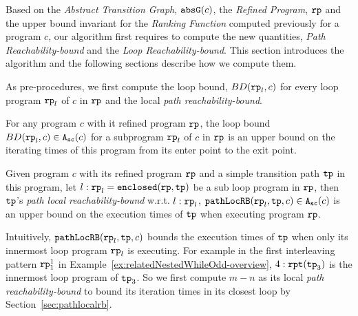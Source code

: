 Based on the \emph{Abstract Transition Graph}, $\mathtt{abs}{\mathtt{G}}(c)$, the \emph{Refined Program}, $\mathtt{rp}$ and the upper bound invariant for the \emph{Ranking Function} computed previously for a program $c$, our algorithm first requires to compute the new quantities, \emph{Path Reachability-bound} and the \emph{Loop Reachability-bound}. This section introduces the algorithm and the following sections describe how we compute them.

As pre-procedures, we first compute the loop bound, $BD(\mathtt{rp}_l, c)$ for every loop program $\mathtt{rp}_l$ of $c$ in $\mathtt{rp}$ and the local \emph{path reachability-bound}.
\begin{defn}
  For any program $c$ with it refined program $\mathtt{rp}$,
  the loop bound $BD(\mathtt{rp}_l, c) \in {\ensuremath{\mathtt{A_{sc}}}}(c)$ for a subprogram $\mathtt{rp}_l$ of $c$ in $\mathtt{rp}$ is an upper bound on the iterating times of this program from its enter point to the exit point.
\end{defn}
% 
\begin{defn}
  Given program $c$ with its refined program $\mathtt{rp}$ and a simple transition path $\mathtt{tp}$ in this program, 
  let $l: \mathtt{rp}_l = \mathtt{enclosed}(\mathtt{rp}, \mathtt{tp})$ be a sub loop program in $\mathtt{rp}$,
  then $\mathtt{tp}$'s \emph{path local reachability-bound} w.r.t. $l: \mathtt{rp}_l$,  $\mathtt{pathLocRB}(\mathtt{rp}_l, \mathtt{tp}, c) \in {\ensuremath{\mathtt{A_{sc}}}}(c)$
  is an upper bound on the execution times of $\mathtt{tp}$ when executing program $\mathtt{rp}$.
\end{defn}
Intuitively,
$\mathtt{pathLocRB}(\mathtt{rp}_l, \mathtt{tp}, c)$ bounds the execution times of $\mathtt{tp}$ when only its innermost loop program $\mathtt{rp}_l$ is executing.
For example in the first interleaving pattern $\mathtt{rp}_1^1$ in Example~\ref{ex:relatedNestedWhileOdd-overview}, 
$4:\mathtt{rpt}(\mathtt{tp}_3)$ is the innermost loop program of $\mathtt{tp}_3$. So we first compute $m - n$ as its local \emph{path reachability-bound} to bound its iteration times in its closest loop by Section~\ref{sec:pathlocalrb}.

